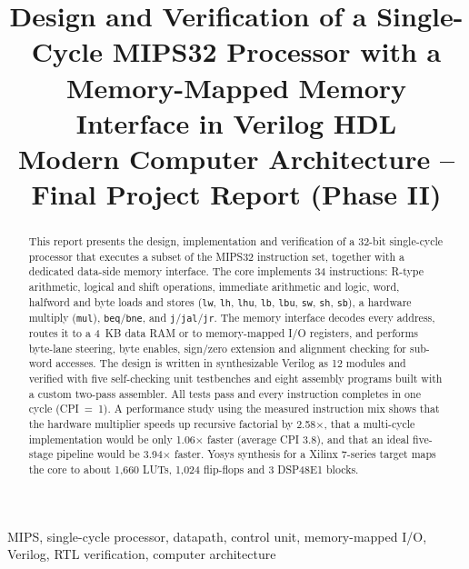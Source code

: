 \documentclass[conference]{IEEEtran}
\begin{document}
\title{Design and Verification of a Single-Cycle MIPS32 Processor with a Memory-Mapped Memory Interface in Verilog HDL\\
{\large Modern Computer Architecture -- Final Project Report (Phase II)}}

\author{
\and
{}
\and
{}
\and
{}
\and
{}
}

\maketitle

\begin{abstract}
This report presents the design, implementation and verification of a 32-bit single-cycle processor that executes a subset of the MIPS32 instruction set, together with a dedicated data-side memory interface. The core implements 34 instructions: R-type arithmetic, logical and shift operations, immediate arithmetic and logic, word, halfword and byte loads and stores (\texttt{lw}, \texttt{lh}, \texttt{lhu}, \texttt{lb}, \texttt{lbu}, \texttt{sw}, \texttt{sh}, \texttt{sb}), a hardware multiply (\texttt{mul}), \texttt{beq}/\texttt{bne}, and \texttt{j}/\texttt{jal}/\texttt{jr}. The memory interface decodes every address, routes it to a 4~KB data RAM or to memory-mapped I/O registers, and performs byte-lane steering, byte enables, sign/zero extension and alignment checking for sub-word accesses. The design is written in synthesizable Verilog as 12 modules and verified with five self-checking unit testbenches and eight assembly programs built with a custom two-pass assembler. All tests pass and every instruction completes in one cycle (CPI~=~1). A performance study using the measured instruction mix shows that the hardware multiplier speeds up recursive factorial by 2.58$\times$, that a multi-cycle implementation would be only 1.06$\times$ faster (average CPI 3.8), and that an ideal five-stage pipeline would be 3.94$\times$ faster. Yosys synthesis for a Xilinx 7-series target maps the core to about 1{,}660 LUTs, 1{,}024 flip-flops and 3 DSP48E1 blocks.
\end{abstract}

\begin{IEEEkeywords}
MIPS, single-cycle processor, datapath, control unit, memory-mapped I/O, Verilog, RTL verification, computer architecture
\end{IEEEkeywords}
\end{document}
